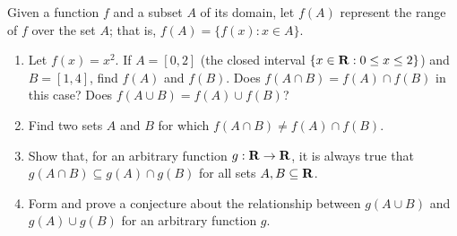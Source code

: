 \documentclass{lew98_solutions}
\begin{document}
\begin{exercise}
\label{ex:1.2.7}
    Given a function \( f \) and a subset \( A \) of its domain, let \( f(A) \) represent the range of \( f \) over the set \( A \); that is, \( f(A) = \{ f(x) : x \in A \} \).
    \begin{enumerate}
        \item Let \( f(x) = x^2 \). If \( A = [0, 2] \) (the closed interval \( \{ x \in \mathbf{R} : 0 \leq x \leq 2 \} \)) and \( B = [1, 4] \), find \( f(A) \) and \( f(B) \). Does \( f(A \cap B) = f(A) \cap f(B) \) in this case? Does \( f(A \cup B) = f(A) \cup f(B) \)?

        \item Find two sets \( A \) and \( B \) for which \( f(A \cap B) \neq f(A) \cap f(B) \).

        \item Show that, for an arbitrary function \( g : \mathbf{R} \to \mathbf{R} \), it is always true that \( g(A \cap B) \subseteq g(A) \cap g(B) \) for all sets \( A, B \subseteq \mathbf{R} \).

        \item Form and prove a conjecture about the relationship between \( g(A \cup B) \) and \( g(A) \cup g(B) \) for an arbitrary function \( g \).
    \end{enumerate}
\end{exercise}
\end{document}

